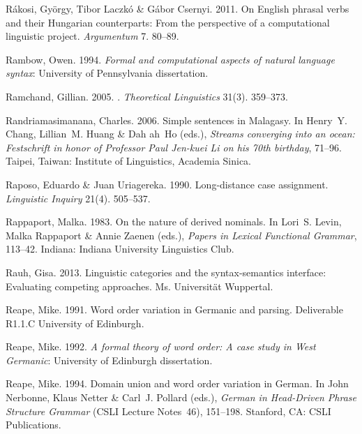 \begin{thebibliography}{1420}
R{\'a}kosi, Gy{\"o}rgy, Tibor Laczk{\'o} \& G{\'a}bor Csernyi. 2011.
\newblock On {English} phrasal verbs and their {Hungarian} counterparts: {From}
  the perspective of a computational linguistic project.
\newblock \emph{Argumentum} 7. 80--89.

Rambow, Owen. 1994.
\newblock \emph{Formal and computational aspects of natural language syntax}:
  University of Pennsylvania dissertation.

Ramchand, Gillian. 2005.
.
\newblock \emph{Theoretical Linguistics} 31(3). 359--373.

Randriamasimanana, Charles. 2006.
\newblock Simple sentences in {Malagasy}.
\newblock In Henry~Y. Chang, Lillian~M. Huang \& Dah ah~Ho (eds.),
  \emph{Streams converging into an ocean: {Festschrift} in honor of {Professor
  Paul Jen-kuei Li} on his 70th birthday}, 71--96. Taipei, Taiwan: Institute of
  Linguistics, Academia Sinica.

Raposo, Eduardo \& Juan Uriagereka. 1990.
\newblock Long-distance case assignment.
\newblock \emph{Linguistic Inquiry} 21(4). 505--537.

Rappaport, Malka. 1983.
\newblock On the nature of derived nominals.
\newblock In Lori~S. Levin, Malka Rappaport \& Annie Zaenen (eds.),
  \emph{Papers in {Lexical Functional Grammar}}, 113--42. Indiana: Indiana
  University Linguistics Club.

Rauh, Gisa. 2013.
\newblock Linguistic categories and the syntax-semantics interface:
  {Evaluating} competing approaches.
\newblock Ms. Universit{\"a}t Wuppertal.

Reape, Mike. 1991.
\newblock Word order variation in {Germanic} and parsing.
 {Deliverable R1.1.C} University of Edinburgh.

Reape, Mike. 1992.
\newblock \emph{A formal theory of word order: {A} case study in {West
  Germanic}}: University of Edinburgh dissertation.

Reape, Mike. 1994.
\newblock Domain union and word order variation in {German}.
\newblock In John Nerbonne, Klaus Netter \& Carl~J. Pollard (eds.),
  \emph{German in {Head-Driven Phrase Structure Grammar}} (CSLI Lecture
  Notes~46), 151--198. Stanford, CA: CSLI Publications.


\end{thebibliography}
